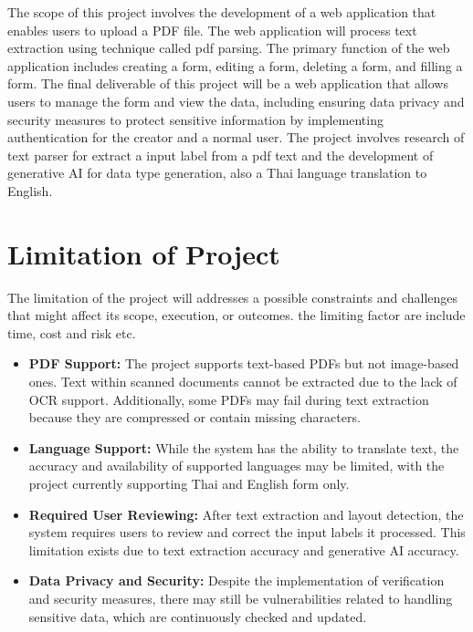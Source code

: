 \documentclass[12pt,oneside,openright,a4paper]{cpe-english-project}
\begin{document}
The scope of this project involves the development of a web application that enables users to upload a PDF file. The web application will process text extraction using technique called pdf parsing. The primary function of the web application includes creating a form, editing a form, deleting a form, and filling a form. The final deliverable of this project will be a web application that allows users to manage the form and view the data, including ensuring data privacy and security measures to protect sensitive information by implementing authentication for the creator and a normal user. The project involves research of text parser for extract a input label from a pdf text and the development of generative AI for data type generation, also a Thai language translation to English.

\section{Limitation of Project}
The limitation of the project will addresses a possible constraints and challenges that might affect its scope, execution, or outcomes. the limiting factor are include time, cost and risk etc.

\begin{itemize}
 \item \textbf{PDF Support:} The project supports text-based PDFs but not image-based ones. Text within scanned documents cannot be extracted due to the lack of OCR support. Additionally, some PDFs may fail during text extraction because they are compressed or contain missing characters.
  
    \item \textbf{Language Support:} While the system has the ability to translate text, the accuracy and availability of supported languages may be limited, with the project currently supporting Thai and English form only.
    
    \item \textbf{Required User Reviewing:} After text extraction and layout detection, the system requires users to review and correct the input labels it processed. This limitation exists due to text extraction accuracy and generative AI accuracy.
      
    \item \textbf{Data Privacy and Security:} Despite the implementation of verification and security measures, there may still be vulnerabilities related to handling sensitive data, which are continuously checked and updated.
\end{itemize}
\end{document}
